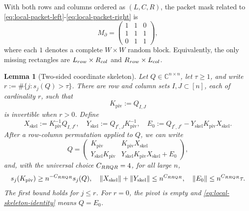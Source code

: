 \documentclass[10pt,a4paper]{amsart}
\newtheorem{lemma}{Lemma}
\newcommand{\C}{\mathbb C}
\begin{document}
With both rows and columns ordered as \((L,C,R)\), the packet mask related to \eqref{eq:local-packet-left}-\eqref{eq:local-packet-right} is
\begin{equation}
 M_{\partial}=
 \begin{pmatrix}
  1&1&0\\
  1&1&1\\
  0&1&1
 \end{pmatrix},
 \label{eq:local-mask}
\end{equation}
where each \(1\) denotes a complete \(W\times W\) random block.  Equivalently,
the only missing rectangles are \(L_{\rm row}\times R_{\rm col}\) and
\(R_{\rm row}\times L_{\rm col}\).

\begin{lemma}[Two-sided coordinate skeleton]
\label{lem:local-rrqr}
Let \(Q\in\C^{n\times n}\), let \(\tau\geq1\), and write
\(r:=\#\{j:s_j(Q)>\tau\}\).  There are row and column sets
\(I,J\subset[n]\), each of cardinality \(r\), such that
\begin{equation}
 K_{\mathrm{piv}}:=Q_{I,J}
 \label{eq:local-Kpiv}
\end{equation}
is invertible when \(r>0\).  Define
\begin{equation}
 X_{\mathrm{skel}}:=K_{\mathrm{piv}}^{-1}Q_{I,J^c},\quad
 Y_{\mathrm{skel}}:=Q_{I^c,J}K_{\mathrm{piv}}^{-1},\quad
 E_0:=Q_{I^c,J^c}-Y_{\mathrm{skel}}K_{\mathrm{piv}}X_{\mathrm{skel}}.
 \label{eq:local-skeleton-definitions}
\end{equation}
After a row-column permutation applied to $Q$, we can write
\begin{equation}
 Q=
 \begin{pmatrix}
  K_{\mathrm{piv}}&K_{\mathrm{piv}}X_{\mathrm{skel}}\\
  Y_{\mathrm{skel}}K_{\mathrm{piv}}&
  Y_{\mathrm{skel}}K_{\mathrm{piv}}X_{\mathrm{skel}}+E_0
 \end{pmatrix},
 \label{eq:local-skeleton-identity}
\end{equation}
and, with the universal choice \(C_{\rm RRQR}=4\), for all large $n$,
\begin{equation}
 s_j(K_{\mathrm{piv}})\geq n^{-C_{\rm RRQR}}s_j(Q),\quad
 \|X_{\mathrm{skel}}\|+\|Y_{\mathrm{skel}}\|
 \leq n^{C_{\rm RRQR}},\quad
 \|E_0\|\leq n^{C_{\rm RRQR}}\tau.
 \label{eq:local-skeleton-bounds}
\end{equation}
The first bound holds for \(j\leq r\).  For \(r=0\), the pivot is empty
and \eqref{eq:local-skeleton-identity} means \(Q=E_0\).
\end{lemma}
\end{document}
